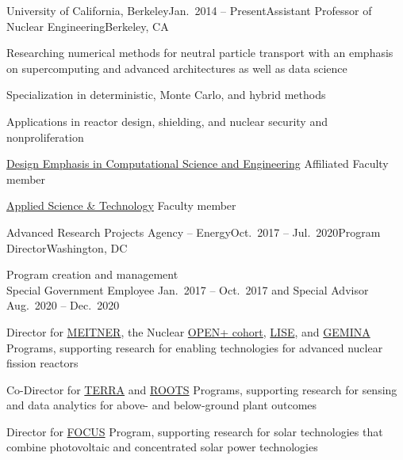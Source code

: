 \begin{rSubsection}{University of California, Berkeley}{Jan.\ 2014 -- Present}{Assistant Professor of Nuclear Engineering}{Berkeley, CA}
\item Researching numerical methods for neutral particle transport with an emphasis on supercomputing and advanced architectures as well as data science
\item Specialization in deterministic, Monte Carlo, and hybrid methods
\item Applications in reactor design, shielding, and nuclear security and nonproliferation
\item \href{http://citris-uc.org/decse-mission/}{Design Emphasis  in Computational Science and Engineering} Affiliated Faculty member
\item \href{http://ast.coe.berkeley.edu/}{Applied Science \& Technology} Faculty member
\end{rSubsection}


\begin{rSubsection}{Advanced Research Projects Agency -- Energy}{Oct.\ 2017 --
Jul.\ 2020}{Program Director}{Washington, DC}
\item Program creation and management\\
Special Government Employee Jan.\ 2017 --
Oct.\ 2017 and Special Advisor Aug.\ 2020 -- Dec.\ 2020
\item Director for
\href{https://arpa-e.energy.gov/?q=arpa-e-programs/meitner}{MEITNER}, the
Nuclear
\href{https://arpa-e.energy.gov/?q=news-item/arpa-e-announces-12-million-five-projects-nuclear-materials-science}{OPEN+
cohort},
\href{https://arpa-e.energy.gov/?q=news-item/arpa-e-innovating-through-unconventional-ideas}{LISE}, and  \href{https://arpa-e.energy.gov/?q=workshop/optimal-operations-advanced-nuclear-reactors}{GEMINA} Programs, supporting research for enabling technologies for advanced nuclear fission reactors
\item Co-Director for \href{https://arpa-e.energy.gov/?q=arpa-e-programs/terra}{TERRA} and \href{https://arpa-e.energy.gov/?q=arpa-e-programs/roots}{ROOTS} Programs, supporting research for sensing and data analytics for above- and below-ground plant outcomes
\item Director for \href{https://arpa-e.energy.gov/?q=arpa-e-programs/focus}{FOCUS} Program, supporting research for solar technologies that combine photovoltaic and concentrated solar power technologies
\end{rSubsection}


